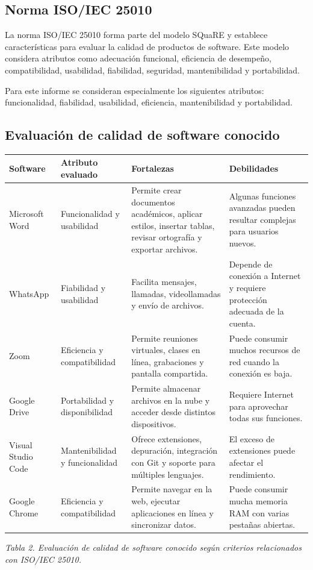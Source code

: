 \documentclass[12pt,a4paper]{article}
\begin{document}
	\subsection{Norma ISO/IEC 25010}
	
	La norma ISO/IEC 25010 forma parte del modelo SQuaRE y establece características para evaluar la calidad de productos de software. Este modelo considera atributos como adecuación funcional, eficiencia de desempeño, compatibilidad, usabilidad, fiabilidad, seguridad, mantenibilidad y portabilidad.
	
	Para este informe se consideran especialmente los siguientes atributos: funcionalidad, fiabilidad, usabilidad, eficiencia, mantenibilidad y portabilidad.
	
	\subsection{Evaluación de calidad de software conocido}
	
	\begin{center}
		\begin{tabular}{|p{3cm}|p{3.5cm}|p{4cm}|p{4cm}|}
			\hline
			\textbf{Software} & \textbf{Atributo evaluado} & \textbf{Fortalezas} & \textbf{Debilidades} \\ \hline
			Microsoft Word & Funcionalidad y usabilidad & Permite crear documentos académicos, aplicar estilos, insertar tablas, revisar ortografía y exportar archivos. & Algunas funciones avanzadas pueden resultar complejas para usuarios nuevos. \\ \hline
			WhatsApp & Fiabilidad y usabilidad & Facilita mensajes, llamadas, videollamadas y envío de archivos. & Depende de conexión a Internet y requiere protección adecuada de la cuenta. \\ \hline
			Zoom & Eficiencia y compatibilidad & Permite reuniones virtuales, clases en línea, grabaciones y pantalla compartida. & Puede consumir muchos recursos de red cuando la conexión es baja. \\ \hline
			Google Drive & Portabilidad y disponibilidad & Permite almacenar archivos en la nube y acceder desde distintos dispositivos. & Requiere Internet para aprovechar todas sus funciones. \\ \hline
			Visual Studio Code & Mantenibilidad y funcionalidad & Ofrece extensiones, depuración, integración con Git y soporte para múltiples lenguajes. & El exceso de extensiones puede afectar el rendimiento. \\ \hline
			Google Chrome & Eficiencia y compatibilidad & Permite navegar en la web, ejecutar aplicaciones en línea y sincronizar datos. & Puede consumir mucha memoria RAM con varias pestañas abiertas. \\ \hline
		\end{tabular}
		
		\textit{Tabla 2. Evaluación de calidad de software conocido según criterios relacionados con ISO/IEC 25010.}
	\end{center}
	
\end{document}
